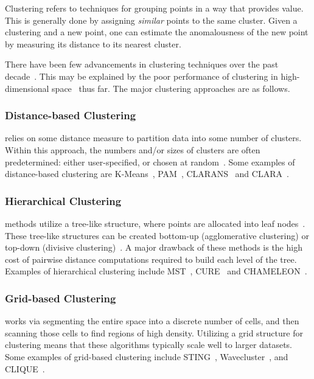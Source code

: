 Clustering refers to techniques for grouping points in a way that provides value.
This is generally done by assigning \textit{similar} points to the same cluster.
Given a clustering and a new point, one can estimate the anomalousness of the new point by measuring its distance to its nearest cluster.

There have been few advancements in clustering techniques over the past decade~\cite{wang2019progress}.
This may be explained by the poor performance of clustering in high-dimensional space~\cite{zhang2013advancements} thus far.
The major clustering approaches are as follows.

\subsubsection{Distance-based Clustering}
\label{subsubsec:introduction:clustering-based-approaches:distance-based-clustering}
relies on some distance measure to partition data into some number of clusters.
Within this approach, the numbers and/or sizes of clusters are often predetermined: either user-specified, or chosen at random~\cite{wang2019progress}.
Some examples of distance-based clustering are
K-Means~\cite{macqueen1967some},
PAM~\cite{kaufman2009finding},
CLARANS~\cite{ng1994efficient} and
CLARA~\cite{kaufman2009finding}.

\subsubsection{Hierarchical Clustering}
\label{subsubsec:introduction:clustering-based-approaches:hierarchical-clustering}
methods utilize a tree-like structure, where points are allocated into leaf nodes~\cite{wang2019progress}.
These tree-like structures can be created bottom-up (agglomerative clustering) or top-down (divisive clustering)~\cite{agrawal1998automatic}.
A major drawback of these methods is the high cost of pairwise distance computations required to build each level of the tree.
Examples of hierarchical clustering include
MST~\cite{charles_zahn_graph_1971},
CURE~\cite{guha1998cure} and
CHAMELEON~\cite{karypis1999hierarchical}.

\subsubsection{Grid-based Clustering}
\label{subsubsec:introduction:clustering-based-approaches:grid-based-clustering}
works via segmenting the entire space into a discrete number of cells, and then scanning those cells to find regions of high density.
Utilizing a grid structure for clustering means that these algorithms typically scale well to larger datasets.
Some examples of grid-based clustering include
STING~\cite{wang1997sting},
Wavecluster~\cite{sheikholeslami2000wavecluster}, and
CLIQUE~\cite{agrawal1998automatic}.

